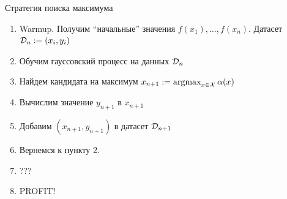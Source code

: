 \documentclass[fullscreen=true, bookmarks=true, hyperref={pdfencoding=unicode}]{beamer}
\begin{document}
\begin{frame}{Стратегия поиска максимума}
    \begin{enumerate}
        \item<1-> Warmup. Получим ``начальные'' значения $f(x_1), \ldots, f(x_n)$. Датасет $\mathcal{D}_n := (x_i, y_i)$
        \item<2-> Обучим гауссовский процесс на данных $\mathcal{D}_n$
        \item<3-> Найдем кандидата на максимум $x_{n+1} := \operatorname{argmax}_{x \in \mathcal{X}} \alpha(x)$
        \item<4-> Вычислим значение $y_{n+1}$ в $x_{n+1}$
        \item<5-> Добавим $(x_{n+1}, y_{n+1})$ в датасет $\mathcal{D}_{n+1}$
        \item<6-> Вернемся к пункту 2.
        \item<7-> ???
        \item<8> PROFIT!
    \end{enumerate}
\end{frame}
\end{document}
